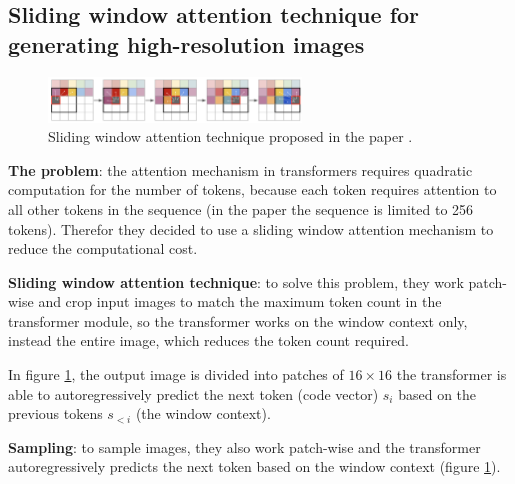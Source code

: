 \subsection{Sliding window attention technique for generating high-resolution images}

\begin{figure}[h]
    \centering
    \includegraphics[width=0.6\textwidth]{images/vqgan_sliding_attention.png}
    \caption{Sliding window attention technique proposed in the paper \cite{vqgan}.}
    \label{fig:vqgan_sliding_window}
\end{figure}

\textbf{The problem}: the attention mechanism in transformers requires quadratic computation for the number of tokens, because each token requires attention to all other tokens in the sequence (in the paper the sequence is limited to 256 tokens). Therefor they decided to use a sliding window attention mechanism to reduce the computational cost.

\textbf{Sliding window attention technique}: to solve this problem, they work patch-wise and crop input images to match the maximum token count in the transformer module, so the transformer works on the window context only, instead the entire image, which reduces the token count required.

In figure \ref{fig:vqgan_sliding_window}, the output image is divided into patches of $16\times 16$  the transformer is able to autoregressively predict the next token (code vector) $s_i$ based on the previous tokens $s_{<i}$ (the window context).


\textbf{Sampling}: to sample images, they also work patch-wise and the transformer autoregressively predicts the next token based on the window context (figure \ref{fig:vqgan_sliding_window}).
